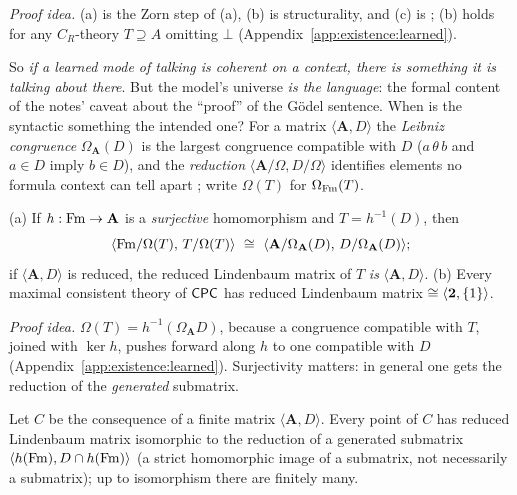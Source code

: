 \emph{Proof idea.} (a) is the Zorn step of (a), (b) is structurality, and (c) is ; (b) holds for any $C_R$-theory $T\supseteq A$ omitting $\bot$ (Appendix~\ref{app:existence:learned}).

So \emph{if a learned mode of talking is coherent on a context, there is something it is talking about there}. But the model's universe \emph{is the language}: the formal content of the notes' caveat about the ``proof'' of the G\"odel sentence. When is the syntactic something the intended one? For a matrix $\langle\mathbf A,D\rangle$ the \emph{Leibniz congruence} $\Omega_{\mathbf A}(D)$ is the largest congruence compatible with $D$ ($a\,\theta\,b$ and $a\in D$ imply $b\in D$), and the \emph{reduction} $\langle\mathbf A/\Omega,D/\Omega\rangle$ identifies elements no formula context can tell apart \citep{blok1989algebraizable,font2016abstract}; write $\Omega(T)$ for $\Omega_{\mathrm{Fm}}(T)$.

\begin{theorem}\label{thm:existence:leibniz}
\textup{(a)} If $h:\mathrm{Fm}\to\mathbf A$ is a \emph{surjective} homomorphism and $T=h^{-1}(D)$, then
\[\langle\Fm/\Omega(T),\,T/\Omega(T)\rangle\ \cong\ \langle\mathbf A/\Omega_{\mathbf A}(D),\,D/\Omega_{\mathbf A}(D)\rangle;\]
if $\langle\mathbf A,D\rangle$ is reduced, the reduced Lindenbaum matrix of $T$ \emph{is} $\langle\mathbf A,D\rangle$. \textup{(b)} Every maximal consistent theory of $\mathsf{CPC}$ has reduced Lindenbaum matrix $\cong\langle\mathbf{2},\{1\}\rangle$.
\end{theorem}

\emph{Proof idea.} $\Omega(T)=h^{-1}(\Omega_{\mathbf A}D)$, because a congruence compatible with $T$, joined with $\ker h$, pushes forward along $h$ to one compatible with $D$ (Appendix~\ref{app:existence:learned}). Surjectivity matters: in general one gets the reduction of the \emph{generated} submatrix.

\begin{proposition}\label{prop:existence:finitematrix}
Let $C$ be the consequence of a finite matrix $\langle\mathbf A,D\rangle$. Every point of $C$ has reduced Lindenbaum matrix isomorphic to the reduction of a generated submatrix $\langle h(\mathrm{Fm}),D\cap h(\mathrm{Fm})\rangle$ (a strict homomorphic image of a submatrix, not necessarily a submatrix); up to isomorphism there are finitely many.
\end{proposition}

